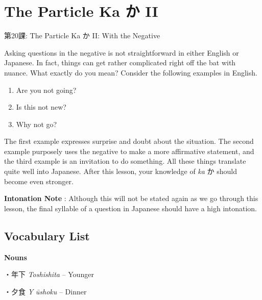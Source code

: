     
\chapter{The Particle Ka か II}

\begin{center}
\begin{Large}
第20課: The Particle Ka か II: With the Negative 
\end{Large}
\end{center}
 
\par{ Asking questions in the negative is not straightforward in either English or Japanese. In fact, things can get rather complicated right off the bat with nuance. What exactly do you mean? Consider the following examples in English. }

\begin{enumerate}

\item Are you not going? \hfill\break

\item Is this not new? \hfill\break

\item Why not go? 
\end{enumerate}

\par{ The first example expresses surprise and doubt about the situation. The second example purposely uses the negative to make a more affirmative statement, and the third example is an invitation to do something. All these things translate quite well into Japanese. After this lesson, your knowledge of \emph{ka }か should become even stronger. }

\par{\textbf{Intonation Note }: Although this will not be stated again as we go through this lesson, the final syllable of a question in Japanese should have a high intonation. }
      
\section{Vocabulary List}
 
\par{\textbf{Nouns }}

\par{・年下 \emph{Toshishita }– Younger }

\par{・夕食 \emph{Y }\emph{ūshoku }– Dinner }

